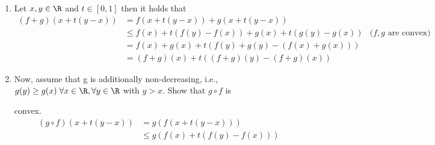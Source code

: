 \begin{enumerate}
\item Let $x,y \in \R$ and $t \in [0, 1]$ then it holds that
\begin{align*}
(f + g)(x + t(y-x)) &= f(x + t(y-x)) + g(x + t(y-x)) \\
&\leq f(x) + t(f(y)-f(x)) + g(x) + t(g(y)-g(x)) & \text{($f,g$ are convex)} \\
& = f(x) + g(x) + t(f(y) + g(y) -(f(x) + g(x))) \\
& = (f + g)(x) + t((f + g)(y) - (f + g)(x))
\end{align*}
\item Now, assume that g is additionally non-decreasing, i.e., $g(y) \geq g(x) \; \forall x \in \R, \forall y \in \R$ with $y > x.$ Show that $g \circ f$ is

convex.
\begin{align*}
(g \circ f)(x + t(y-x)) &= g(f(x + t(y-x))) \\
&\leq g(f(x) + t(f(y)-f(x))) \\
\end{align*}

\end{enumerate}
